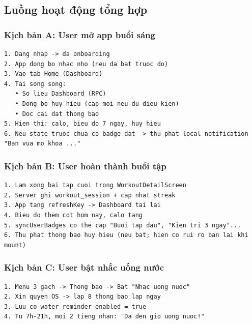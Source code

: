 \documentclass[12pt,a4paper]{article}
\begin{document}
\subsection{Luồng hoạt động tổng
hợp}\label{luux1ed3ng-houx1ea1t-ux111ux1ed9ng-tux1ed5ng-hux1ee3p}

\subsubsection{Kịch bản A: User mở app buổi
sáng}\label{kux1ecbch-bux1ea3n-a-user-mux1edf-app-buux1ed5i-suxe1ng}

\begin{lstlisting}
1. Dang nhap -> da onboarding
2. App dong bo nhac nho (neu da bat truoc do)
3. Vao tab Home (Dashboard)
4. Tai song song:
   • So lieu Dashboard (RPC)
   • Dong bo huy hieu (cap moi neu du dieu kien)
   • Doc cai dat thong bao
5. Hien thi: calo, bieu do 7 ngay, huy hieu
6. Neu state truoc chua co badge dat -> thu phat local notification "Ban vua mo khoa ..."
\end{lstlisting}

\subsubsection{Kịch bản B: User hoàn thành buổi
tập}\label{kux1ecbch-bux1ea3n-b-user-houxe0n-thuxe0nh-buux1ed5i-tux1eadp}

\begin{lstlisting}
1. Lam xong bai tap cuoi trong WorkoutDetailScreen
2. Server ghi workout_session + cap nhat streak
3. App tang refreshKey -> Dashboard tai lai
4. Bieu do them cot hom nay, calo tang
5. syncUserBadges co the cap "Buoi tap dau", "Kien tri 3 ngay"...
6. Thu phat thong bao huy hieu (neu bat; hien co rui ro ban lai khi mount)
\end{lstlisting}

\subsubsection{Kịch bản C: User bật nhắc uống
nước}\label{kux1ecbch-bux1ea3n-c-user-bux1eadt-nhux1eafc-uux1ed1ng-nux1b0ux1edbc}

\begin{lstlisting}
1. Menu 3 gach -> Thong bao -> Bat "Nhac uong nuoc"
2. Xin quyen OS -> lap 8 thong bao lap ngay
3. Luu co water_reminder_enabled = true
4. Tu 7h-21h, moi 2 tieng nhan: "Da den gio uong nuoc!"
\end{lstlisting}
\end{document}
